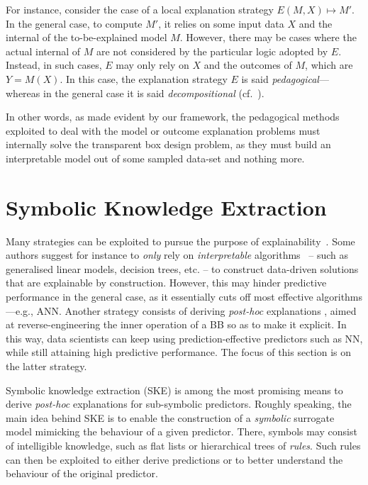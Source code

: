 \documentclass[12pt,a4paper,openright,twoside]{book}
\begin{document}
For instance, consider the case of a local explanation strategy $E(M, X) \mapsto M'$.
%
In the general case, to compute $M'$, it relies on some input data $X$ and the internal of the to-be-explained model $M$.
%
However, there may be cases where the actual internal of $M$ are not considered by the particular logic adopted by $E$.
%
Instead, in such cases, $E$ may only rely on $X$ and the outcomes of $M$, which are $Y = M(X)$.
%
In this case, the explanation strategy $E$ is said \emph{pedagogical}---whereas in the general case it is said \emph{decompositional} (cf.\ \cite{AndrewsDT95}).

In other words, as made evident by our framework, the pedagogical methods exploited to deal with the model or outcome explanation problems must internally solve the transparent box design problem, as they must build an interpretable model out of some sampled data-set and nothing more.

\section{Symbolic Knowledge Extraction}\label{sec:knowledge-extraction}


Many strategies can be exploited to pursue the purpose of explainability~\cite{GuidottiMRTGP19}.
%
Some authors suggest for instance to \emph{only} rely on \emph{interpretable} algorithms~\cite{Rudin2019} -- such as generalised linear models, decision trees, etc. -- to construct data-driven solutions that are explainable by construction.
%
However, this may hinder predictive performance in the general case, as it essentially cuts off most effective algorithms---e.g., ANN.
%
Another strategy consists of deriving \emph{post-hoc} explanations \cite{KENNY2021103459}, aimed at reverse-engineering the inner operation of a BB so as to make it explicit.
%
In this way, data scientists can keep using prediction-effective predictors such as NN, while still attaining high predictive performance.
%
The focus of this section is on the latter strategy.

Symbolic knowledge extraction (SKE) \cite{GarcezBG01} is among the most promising means to derive \emph{post-hoc} explanations for sub-symbolic predictors.
%
Roughly speaking, the main idea behind SKE is to enable the construction of a \emph{symbolic} surrogate model mimicking the behaviour of a given predictor.
%
There, symbols may consist of intelligible knowledge, such as flat lists or hierarchical trees of \emph{rules}.
%
Such rules can then be exploited to either derive predictions or to better understand the behaviour of the original predictor.
\end{document}
